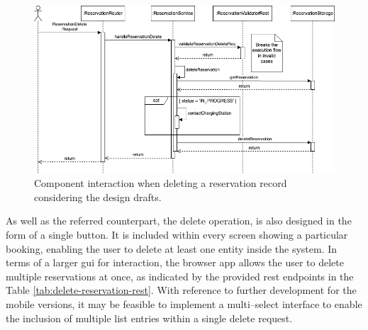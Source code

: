 \newpage

\begin{figure}[h]
    \centering
    \includegraphics[scale=0.4]{resources/images/main/6_implementation/processes/ReservationDelete.png}
    \caption{Component interaction when deleting a reservation record considering the design drafts.}
    \label{fig:delete-reservation-seqflow}
\end{figure}

\noindent As well as the referred counterpart, the delete operation, is also designed in the form of a single button. It is included within every screen showing a particular booking, enabling the user to delete at least one entity inside the system.
In terms of a larger \acrshort{gui} for interaction, the browser app allows the user to delete multiple reservations at once, as indicated by the provided \acrshort{rest} endpoints in the Table \ref{tab:delete-reservation-rest}.
With reference to further development for the mobile versions, it may be feasible to implement a multi--select interface to enable the inclusion of multiple list entries within a single delete request.

